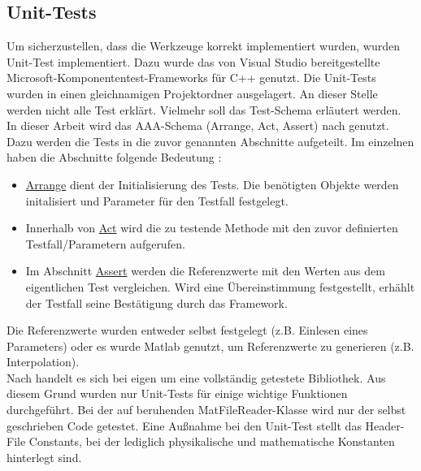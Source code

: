 \subsection{Unit-Tests}
Um sicherzustellen, dass die Werkzeuge korrekt implementiert wurden, wurden Unit-Test implementiert. Dazu wurde das von Visual Studio bereitgestellte Microsoft-Komponententest-Frameworks für C++ genutzt. Die Unit-Tests wurden in einen gleichnamigen Projektordner ausgelagert. An dieser Stelle werden nicht alle Test erklärt. Vielmehr soll das Test-Schema erläutert werden.\\ In dieser Arbeit wird das AAA-Schema  (Arrange, Act, Assert) nach \cite{Microsoft.2018}  genutzt. Dazu werden die Tests in die zuvor genannten Abschnitte aufgeteilt. Im einzelnen haben die Abschnitte folgende Bedeutung \cite{Microsoft.2018}: 
\begin{itemize}
	\item  \underline{Arrange} dient der Initialisierung des Tests. Die benötigten Objekte werden initalisiert und Parameter für den Testfall festgelegt.   
	
	\item  Innerhalb von \underline{Act} wird die zu testende Methode mit den zuvor definierten Testfall/Parametern aufgerufen.
	
	\item Im Abschnitt \underline{Assert} werden die Referenzwerte mit den Werten aus dem eigentlichen Test vergleichen. Wird eine Übereinstimmung festgestellt, erhählt der Testfall seine Bestätigung durch das Framework.
\end{itemize}
Die Referenzwerte wurden entweder selbst festgelegt (z.B. Einlesen eines Parameters) oder es wurde Matlab genutzt, um Referenzwerte zu generieren (z.B. Interpolation). \\
Nach \cite{TuxFamily.2018} handelt es sich bei eigen um eine vollständig getestete Bibliothek. Aus diesem Grund wurden nur Unit-Tests für einige wichtige Funktionen durchgeführt. Bei der auf \cite{Hulbert.2013} beruhenden MatFileReader-Klasse wird nur der selbst geschrieben Code getestet. Eine Außnahme bei den Unit-Test stellt das Header-File Constants, bei der lediglich physikalische und mathematische Konstanten hinterlegt sind. 

